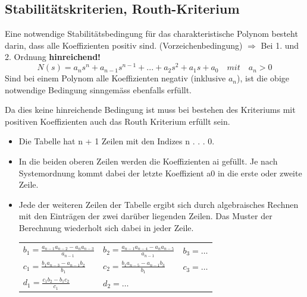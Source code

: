 \subsection{Stabilitätskriterien, Routh-Kriterium }

Eine notwendige Stabilitätsbedingung für das charakteristische Polynom besteht darin, dass alle Koeffizienten positiv sind. (Vorzeichenbedingung) $\Rightarrow$ Bei 1. und 2. Ordnung \textbf{hinreichend!}
\begin{equation}
\boxed{N(s) = a_{n}s^n + a_{n-1}s^{n-1} + . . . + a_2s^2 + a_1s + a_0 \quad mit \quad a_n > 0}
\end{equation}
Sind bei einem Polynom alle Koeffizienten negativ (inklusive $a_n$), ist die obige
notwendige Bedingung sinngemäss ebenfalls erfüllt.



Da dies keine hinreichende Bedingung ist muss bei bestehen des Kriteriums mit positiven Koeffizienten auch das Routh Kriterium erfüllt sein.
\begin{itemize}
	\item Die Tabelle hat n + 1 Zeilen mit den Indizes n . . . 0.
	\item In die beiden oberen Zeilen werden die Koeffizienten ai gefüllt. Je nach Systemordnung
	kommt dabei der letzte Koeffizient a0 in die erste oder zweite Zeile.
	
	\item {Jede der weiteren Zeilen der Tabelle ergibt sich durch algebraisches Rechnen
	mit den Einträgen der zwei darüber liegenden Zeilen. Das Muster der Berechnung
	wiederholt sich dabei in jeder Zeile.\\
	\begin{tabularx}{\textwidth}{XXX}
	$b_1=\frac{a_{n-1}a_{n-2}-a_{n}a_{n-3}}{a_{n-1}}$
	& $b_2=\frac{a_{n-1}a_{n-4}-a_{n}a_{n-5}}{a_{n-1}}$
	& $b_3=\ldots$ \\
	$c_1=\frac{b_{1}a_{n-3}-a_{n-1}b_{2}}{b_{1}}$
	& $c_2=\frac{b_{1}a_{n-5}-a_{n-1}b_{3}}{b_{1}}$
	& $c_3=\ldots$ \\
	$d_1=\frac{c_{1}b_{2}-b_{1}c_{2}}{c_{1}}$
	& $d_2=\ldots$ & \\
	\end{tabularx}}
\end{itemize}


